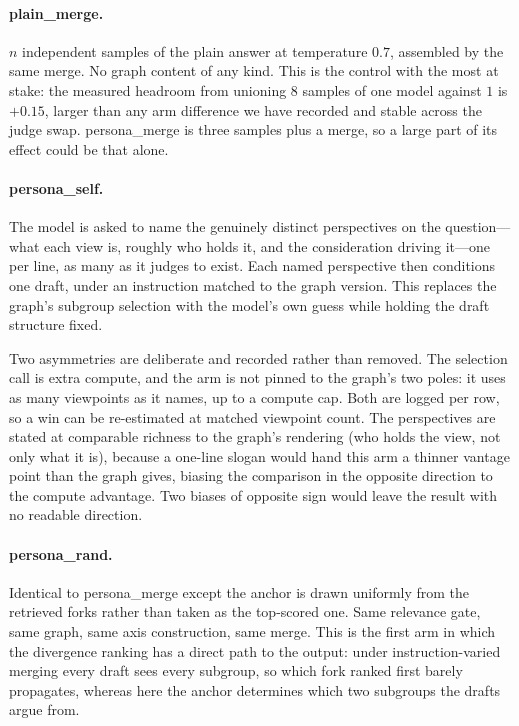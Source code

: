 \documentclass[11pt]{article}
\theoremstyle{definition}
\begin{document}
\paragraph{plain\_merge.} $n$ independent samples of the plain answer at
temperature $0.7$, assembled by the same merge. No graph content of any kind.
This is the control with the most at stake: the measured headroom from unioning
$8$ samples of one model against $1$ is $+0.15$, larger than any arm difference
we have recorded and stable across the judge swap. persona\_merge is three
samples plus a merge, so a large part of its effect could be that alone.

\paragraph{persona\_self.} The model is asked to name the genuinely distinct
perspectives on the question---what each view is, roughly who holds it, and the
consideration driving it---one per line, as many as it judges to exist. Each
named perspective then conditions one draft, under an instruction matched to the
graph version. This replaces the graph's subgroup selection with the model's own
guess while holding the draft structure fixed.

Two asymmetries are deliberate and recorded rather than removed. The selection
call is extra compute, and the arm is not pinned to the graph's two poles: it
uses as many viewpoints as it names, up to a compute cap. Both are logged per
row, so a win can be re-estimated at matched viewpoint count. The perspectives
are stated at comparable richness to the graph's rendering (who holds the view,
not only what it is), because a one-line slogan would hand this arm a thinner
vantage point than the graph gives, biasing the comparison in the opposite
direction to the compute advantage. Two biases of opposite sign would leave the
result with no readable direction.

\paragraph{persona\_rand.} Identical to persona\_merge except the anchor is
drawn uniformly from the retrieved forks rather than taken as the top-scored
one. Same relevance gate, same graph, same axis construction, same merge. This
is the first arm in which the divergence ranking has a direct path to the
output: under instruction-varied merging every draft sees every subgroup, so
which fork ranked first barely propagates, whereas here the anchor determines
which two subgroups the drafts argue from.
\end{document}
